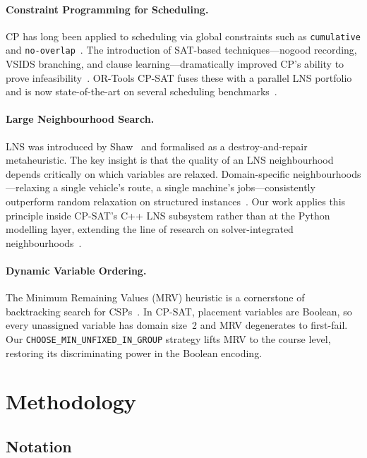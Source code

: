\documentclass[conference]{IEEEtran}
\begin{document}
\paragraph{Constraint Programming for Scheduling.}
CP has long been applied to scheduling via global constraints such as
\texttt{cumulative} and \texttt{no-overlap}~\cite{Baptiste2001}. The
introduction of SAT-based techniques---nogood recording, VSIDS branching, and
clause learning---dramatically improved CP's ability to prove
infeasibility~\cite{Ohrimenko2009}. OR-Tools CP-SAT fuses these with a
parallel LNS portfolio and is now state-of-the-art on several scheduling
benchmarks~\cite{ortools,Perron2023}.

\paragraph{Large Neighbourhood Search.}
LNS was introduced by Shaw~\cite{Shaw1998} and formalised as a destroy-and-repair
metaheuristic. The key insight is that the quality of an LNS neighbourhood
depends critically on which variables are relaxed. Domain-specific
neighbourhoods---relaxing a single vehicle's route, a single machine's
jobs---consistently outperform random relaxation on structured
instances~\cite{Pisinger2010}. Our work applies this principle inside CP-SAT's
C++ LNS subsystem rather than at the Python modelling layer, extending the line
of research on solver-integrated neighbourhoods~\cite{Chu2012}.

\paragraph{Dynamic Variable Ordering.}
The Minimum Remaining Values (MRV) heuristic is a cornerstone of
backtracking search for CSPs~\cite{Haralick1980}. In CP-SAT, placement
variables are Boolean, so every unassigned variable has domain size~2 and MRV
degenerates to first-fail. Our \texttt{CHOOSE\_MIN\_UNFIXED\_IN\_GROUP}
strategy lifts MRV to the course level, restoring its discriminating power in
the Boolean encoding.

\section{Methodology}\label{sec:method}

\subsection{Notation}\label{sec:notation}
\end{document}

